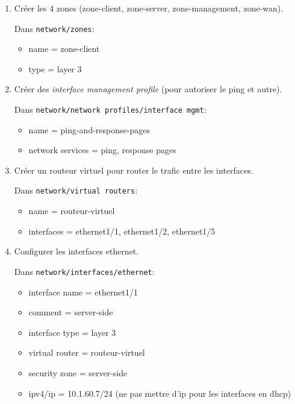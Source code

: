 \documentclass[a4paper]{article}
\begin{document}
\begin{enumerate}
    \item Créer les 4 zones (zone-client, zone-server, zone-management, zone-wan).
    \begin{example}
        Dans \texttt{network/zones}:
        \begin{itemize}
            \item name = zone-client
            \item type = layer 3
        \end{itemize}
    \end{example}
    \item Créer des \textit{interface management profile} (pour autoriser le ping et autre).
    \begin{example}
        Dans \texttt{network/network profiles/interface mgmt}:
        \begin{itemize}
            \item name = ping-and-response-pages
            \item network services = ping, response pages
        \end{itemize}
    \end{example}
    \item Créer un routeur virtuel pour router le trafic entre les interfaces.
    \begin{example}
        Dans \texttt{network/virtual routers}:
        \begin{itemize}
            \item name = routeur-virtuel
            \item interfaces = ethernet1/1, ethernet1/2, ethernet1/5
        \end{itemize}
    \end{example}
    \item Configurer les interfaces ethernet.
    \begin{example}
        Dans \texttt{network/interfaces/ethernet}:
        \begin{itemize}
            \item interface name = ethernet1/1
            \item comment = server-side
            \item interface type = layer 3
            \item virtual router = routeur-virtuel
            \item security zone = server-side
            \item ipv4/ip = 10.1.60.7/24 (ne pas mettre d'ip pour les interfaces en dhcp)

\end{itemize}
\end{example}
\end{enumerate}
\end{document}
